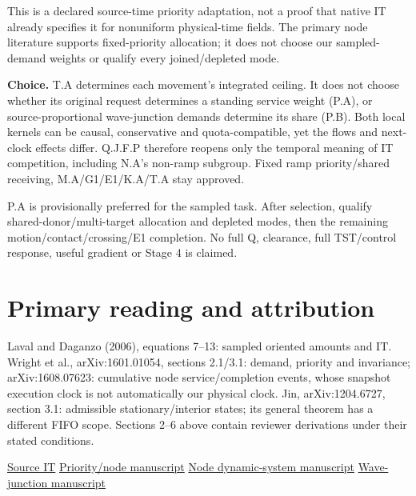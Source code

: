 \documentclass[11pt,a4paper]{article}
\begin{document}
This is a declared source-time priority adaptation, not a proof that native
IT already specifies it for nonuniform physical-time fields. The primary
node literature supports fixed-priority allocation; it does not choose our
sampled-demand weights or qualify every joined/depleted mode.

\textbf{Choice.} T.A determines each movement's integrated ceiling. It does
not choose whether its original request determines a standing service weight
(P.A), or source-proportional wave-junction demands determine its share (P.B).
Both local kernels can be causal, conservative and quota-compatible, yet the
flows and next-clock effects differ. Q.J.F.P therefore reopens only the
temporal meaning of IT competition, including N.A's non-ramp subgroup.
Fixed ramp priority/shared receiving, M.A/G1/E1/K.A/T.A stay approved.

P.A is provisionally preferred for the sampled task. After selection,
qualify shared-donor/multi-target allocation and depleted modes, then the
remaining motion/contact/crossing/E1 completion. No full Q, clearance, full
TST/control response, useful gradient or Stage 4 is claimed.

\section*{Primary reading and attribution}
Laval and Daganzo (2006), equations 7--13: sampled oriented amounts and IT.
Wright et al., arXiv:1601.01054, sections 2.1/3.1: demand, priority and
invariance; arXiv:1608.07623: cumulative node service/completion events, whose
snapshot execution clock is not automatically our physical clock.
Jin, arXiv:1204.6727, section 3.1: admissible stationary/interior states;
its general theorem has a different FIFO scope. Sections 2--6 above contain
reviewer derivations under their stated conditions.

\href{https://doi.org/10.1016/j.trb.2005.04.003}{Source IT}\quad
\href{https://arxiv.org/pdf/1601.01054}{Priority/node manuscript}\quad
\href{https://arxiv.org/pdf/1608.07623}{Node dynamic-system manuscript}\quad
\href{https://arxiv.org/pdf/1204.6727}{Wave-junction manuscript}
\end{document}
